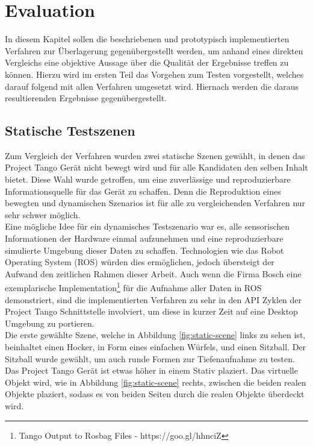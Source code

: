 \chapter{Evaluation}

In diesem Kapitel sollen die beschriebenen und prototypisch implementierten Verfahren zur Überlagerung gegenübergestellt werden, um anhand eines direkten Vergleichs eine objektive Aussage über die Qualität der Ergebnisse treffen zu können. Hierzu wird im ersten Teil das Vorgehen zum Testen vorgestellt, welches darauf folgend mit allen Verfahren umgesetzt wird. Hiernach werden die daraus resultierenden Ergebnisse gegenübergestellt.

\section{Statische Testszenen}

Zum Vergleich der Verfahren wurden zwei statische Szenen gewählt, in denen das Project Tango Gerät nicht bewegt wird und für alle Kandidaten den selben Inhalt bietet. Diese Wahl wurde getroffen, um eine zuverlässige und reproduzierbare Informationsquelle für das Gerät zu schaffen. Denn die Reproduktion eines bewegten und dynamischen Szenarios ist für alle zu vergleichenden Verfahren nur sehr schwer möglich. \\

Eine mögliche Idee für ein dynamisches Testszenario war es, alle sensorischen Informationen der Hardware einmal aufzunehmen und eine reproduzierbare simulierte Umgebung dieser Daten zu schaffen. Technologien wie das Robot Operating System (ROS) würden dies ermöglichen, jedoch übersteigt der Aufwand den zeitlichen Rahmen dieser Arbeit. Auch wenn die Firma Bosch eine exemplarische Implementation\footnote{Tango Output to Rosbag Files - https://goo.gl/hhnciZ} für die Aufnahme aller Daten in ROS demonstriert, sind die implementierten Verfahren zu sehr in den API Zyklen der Project Tango Schnittstelle involviert, um diese in kurzer Zeit auf eine Desktop Umgebung zu portieren.\\

Die erste gewählte Szene, welche in Abbildung \ref{fig:static-scene} links zu sehen ist, beinhaltet einen Hocker, in Form eines einfachen  Würfels, und einen Sitzball. Der Sitzball wurde gewählt, um auch runde Formen zur Tiefenaufnahme zu testen. Das Project Tango Gerät ist etwas höher in einem Stativ plaziert. Das virtuelle Objekt wird, wie in Abbildung \ref{fig:static-scene} rechts, zwischen die beiden realen Objekte plaziert, sodass es von beiden Seiten durch die realen Objekte überdeckt wird. \\

